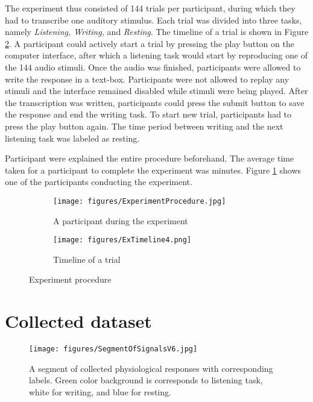 \documentclass{article}
\begin{document}
The experiment thus consisted of 144 trials per participant, during which they had to transcribe one auditory stimulus. Each trial was divided into three tasks, namely \textit{Listening, Writing,} and \textit{Resting}. The timeline of a trial is shown in Figure \ref{fig:ex_timeline}. A participant could actively start a trial by pressing the play button on the computer interface, after which a listening task would start by reproducing one of the 144 audio stimuli. Once the audio was finished, participants were allowed to write the response in a text-box. Participants were not allowed to replay any stimuli and the interface remained disabled while stimuli were being played. After the transcription was written, participants could press the submit button to save the response and end the writing task. To start new trial, participants had to press the play button again. The time period between writing and the next listening task was labeled as resting. 

Participant were explained the entire procedure beforehand. The average time taken for a participant to complete the experiment was  minutes. Figure \ref{fig:ex_participant} shows one of the participants conducting the experiment.

\begin{figure}[t]
     \centering
     \begin{subfigure}[b]{0.40\textwidth}
         \centering
         \texttt{[image: figures/ExperimentProcedure.jpg]}
         \caption{A participant during the experiment}
         \label{fig:ex_participant}
     \end{subfigure}
     \hfill
     \begin{subfigure}[b]{0.53\textwidth}
         \centering
         \texttt{[image: figures/ExTimeline4.png]}
         \caption{Timeline of a trial}
         \label{fig:ex_timeline}
     \end{subfigure}
        \caption{Experiment procedure}
        \label{fig:ex_procedure}
\end{figure}

\section{Collected dataset}

\label{S:Dataset}
\begin{figure}[ht]
 \centering
    \texttt{[image: figures/SegmentOfSignalsV6.jpg]}
    \caption{A segment of collected physiological responses with corresponding labels. Green color background is corresponds to listening task, white for writing, and blue for resting.}
    \label{fig:signals}
\end{figure}
\end{document}
